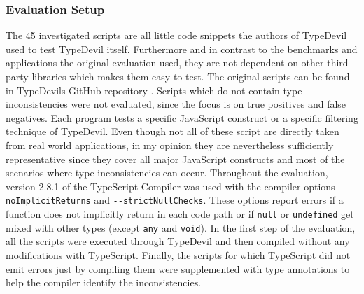 \documentclass[runningheads,a4paper]{llncs}
\begin{document}
\subsubsection{Evaluation Setup}
The 45 investigated scripts are all little code snippets the authors of TypeDevil used to test TypeDevil itself. 
Furthermore and in contrast to the benchmarks and applications the original evaluation used, they are not dependent on other third party libraries which makes them easy to test.
The original scripts can be found in TypeDevils GitHub repository \cite{TypeDevilGitHubTests}.
Scripts which do not contain type inconsistencies were not evaluated, since the focus is on true positives and false negatives.
Each program tests a specific JavaScript construct or a specific filtering technique of TypeDevil.
Even though not all of these script are directly taken from real world applications, in my opinion they are nevertheless sufficiently representative since they cover all major JavaScript constructs and most of the scenarios where type inconsistencies can occur.
Throughout the evaluation, version 2.8.1 of the TypeScript Compiler was used with the compiler options \lstinline[columns=fixed]{--noImplicitReturns} and \lstinline[columns=fixed]{--strictNullChecks}.
These options report errors if a function does not implicitly return in each code path or if \lstinline[columns=fixed]{null} or \lstinline[columns=fixed]{undefined} get mixed with other types (except \lstinline[columns=fixed]{any} and \lstinline[columns=fixed]{void}).
In the first step of the evaluation, all the scripts were executed through TypeDevil and then compiled without any modifications with TypeScript.
Finally, the scripts for which TypeScript did not emit errors just by compiling them were supplemented with type annotations to help the compiler identify the inconsistencies.
\end{document}
